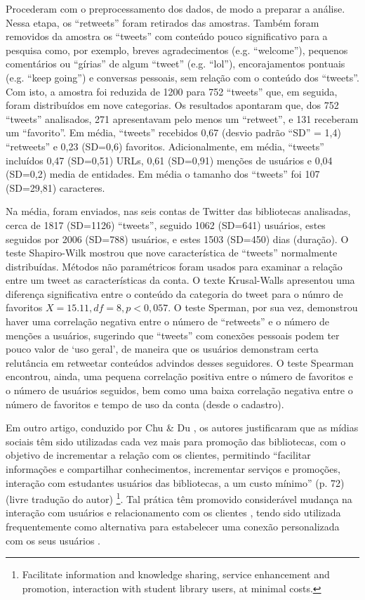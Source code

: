 Procederam com o preprocessamento dos dados, de modo a preparar a análise. Nessa etapa, os ``retweets'' foram retirados das amostras. Também foram removidos da amostra os ``tweets'' com conteúdo pouco significativo para a pesquisa como, por exemplo, breves agradecimentos (e.g. “welcome”), pequenos comentários ou “gírias” de algum ``tweet'' (e.g. “lol”), encorajamentos pontuais (e.g. “keep going”) e conversas pessoais, sem relação com o conteúdo dos ``tweets''. Com isto, a amostra foi reduzida de 1200 para 752 ``tweets'' que, em seguida, foram distribuídos em nove categorias. Os resultados apontaram que, dos 752 ``tweets'' analisados, 271 apresentavam pelo menos um ``retweet'', e 131 receberam um “favorito”.  Em média, ``tweets'' recebidos 0,67 (desvio padrão “SD” = 1,4) ``retweets'' e 0,23 (SD=0,6) favoritos. Adicionalmente, em média, ``tweets'' incluídos 0,47 (SD=0,51) URLs, 0,61 (SD=0,91) menções de usuários e 0,04 (SD=0,2) media de entidades. Em média o tamanho dos ``tweets'' foi 107 (SD=29,81) caracteres. 

Na média, foram enviados, nas seis contas de Twitter das bibliotecas analisadas, cerca de 1817 (SD=1126) ``tweets'', seguido 1062 (SD=641) usuários, estes seguidos por 2006 (SD=788) usuários, e estes 1503 (SD=450) dias (duração). O teste Shapiro-Wilk mostrou que nove característica de ``tweets'' normalmente distribuídas. Métodos não paramétricos foram usados para examinar a relação entre um tweet as características da conta. 
O texte Krusal-Walls apresentou uma diferença significativa entre o conteúdo da categoria do tweet para o númro de favoritos $X=15.11, df=8, p<0,057$. O teste Sperman, por sua vez, demonstrou haver uma correlação negativa entre o número de ``retweets'' e o número de menções a usuários, sugerindo que ``tweets'' com conexões pessoais podem ter pouco valor de ‘uso geral’, de maneira que os usuários demonstram certa relutância em retweetar conteúdos advindos desses seguidores. O teste Spearman encontrou, ainda, uma pequena correlação positiva entre o número de favoritos e o número de usuários seguidos, bem como uma baixa correlação negativa entre o número de favoritos e tempo de uso da conta (desde o cadastro). 

Em outro artigo, conduzido por Chu \& Du \cite{Chu2012}, os autores justificaram que as mídias sociais têm sido utilizadas cada vez mais para promoção das bibliotecas, com o objetivo de incrementar a relação com os clientes, permitindo “facilitar informações e compartilhar conhecimentos, incrementar serviços e promoções, interação com estudantes usuários das bibliotecas, a um custo mínimo” (p. 72) (livre tradução do autor) \footnote{Facilitate information and knowledge sharing, service enhancement and promotion, interaction with student library users, at minimal costs.}. Tal prática têm promovido considerável mudança na interação com usuários e relacionamento com os clientes \cite{del2012libraries}, tendo sido utilizada frequentemente como alternativa para estabelecer uma conexão personalizada com os seus usuários \cite{boateng2014web}. 

